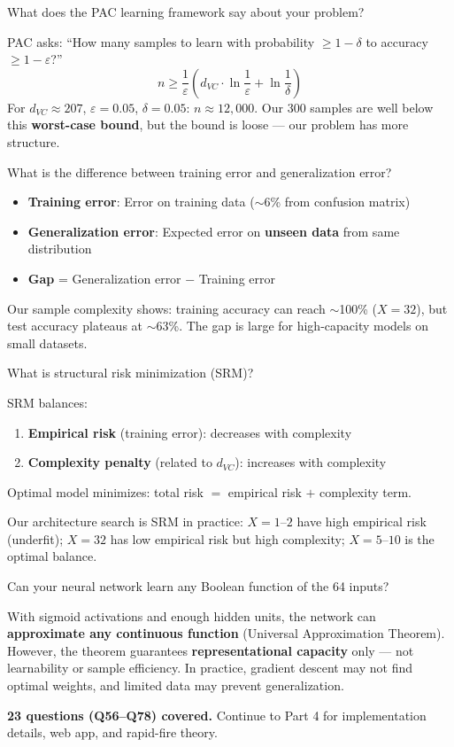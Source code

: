 \documentclass[11pt,a4paper]{article}
\newcounter{qcounter}
\newcommand{\vq}[1]{\stepcounter{qcounter}\begin{tcolorbox}[qbox, title=Q\theqcounter]#1\end{tcolorbox}}
\newcommand{\va}[1]{\begin{tcolorbox}[abox, title=Answer]#1\end{tcolorbox}\vspace{6pt}}
\begin{document}
\vq{What does the PAC learning framework say about your problem?}
\va{PAC asks: ``How many samples to learn with probability $\geq 1-\delta$ to accuracy $\geq 1-\varepsilon$?''
$$n \geq \frac{1}{\varepsilon}\left(d_{VC} \cdot \ln\frac{1}{\varepsilon} + \ln\frac{1}{\delta}\right)$$
For $d_{VC} \approx 207$, $\varepsilon=0.05$, $\delta=0.05$: $n \approx 12{,}000$. Our 300 samples are well below this \textbf{worst-case bound}, but the bound is loose — our problem has more structure.
}

\vq{What is the difference between training error and generalization error?}
\va{
\begin{itemize}[nosep]
    \item \textbf{Training error}: Error on training data ($\sim$6\% from confusion matrix)
    \item \textbf{Generalization error}: Expected error on \textbf{unseen data} from same distribution
    \item \textbf{Gap} = Generalization error $-$ Training error
\end{itemize}
Our sample complexity shows: training accuracy can reach $\sim$100\% ($X=32$), but test accuracy plateaus at $\sim$63\%. The gap is large for high-capacity models on small datasets.
}

\vq{What is structural risk minimization (SRM)?}
\va{SRM balances:
\begin{enumerate}[nosep]
    \item \textbf{Empirical risk} (training error): decreases with complexity
    \item \textbf{Complexity penalty} (related to $d_{VC}$): increases with complexity
\end{enumerate}
Optimal model minimizes: total risk $=$ empirical risk $+$ complexity term.

Our architecture search is SRM in practice: $X=1$--$2$ have high empirical risk (underfit); $X=32$ has low empirical risk but high complexity; $X=5$--$10$ is the optimal balance.
}

\vq{Can your neural network learn any Boolean function of the 64 inputs?}
\va{With sigmoid activations and enough hidden units, the network can \textbf{approximate any continuous function} (Universal Approximation Theorem). However, the theorem guarantees \textbf{representational capacity} only — not learnability or sample efficiency. In practice, gradient descent may not find optimal weights, and limited data may prevent generalization.}

\begin{tcolorbox}[tipbox, title=\textbf{End of Part 3}]
\textbf{23 questions (Q56--Q78) covered.} Continue to Part 4 for implementation details, web app, and rapid-fire theory.
\end{tcolorbox}
\end{document}
